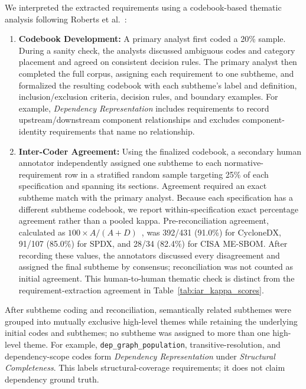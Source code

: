 We interpreted the extracted requirements using a codebook-based thematic analysis following Roberts et al.~\cite{roberts2019attempting}:

\begin{enumerate}
\item \textbf{Codebook Development:} A primary analyst first coded a 20\% sample. During a sanity check, the analysts discussed ambiguous codes and category placement and agreed on consistent decision rules. The primary analyst then completed the full corpus, assigning each requirement to one subtheme, and formalized the resulting codebook with each subtheme's label and definition, inclusion/exclusion criteria, decision rules, and boundary examples. For example, \textit{Dependency Representation} includes requirements to record upstream/downstream component relationships and excludes component-identity requirements that name no relationship.
\item \textbf{Inter-Coder Agreement:} Using the finalized codebook, a secondary human annotator independently assigned one subtheme to each normative-requirement row in a stratified random sample targeting 25\% of each specification and spanning its sections. Agreement required an exact subtheme match with the primary analyst. Because each specification has a different subtheme codebook, we report within-specification exact percentage agreement rather than a pooled kappa. Pre-reconciliation agreement, calculated as $100\times A/(A+D)$~\cite{milesandhuberman1994,roberts2019attempting}, was 392/431 (91.0\%) for CycloneDX, 91/107 (85.0\%) for SPDX, and 28/34 (82.4\%) for CISA ME-SBOM. After recording these values, the annotators discussed every disagreement and assigned the final subtheme by consensus; reconciliation was not counted as initial agreement. This human-to-human thematic check is distinct from the requirement-extraction agreement in Table~\ref{tab:iar_kappa_scores}.

\end{enumerate}

After subtheme coding and reconciliation, semantically related subthemes were grouped into mutually exclusive high-level themes while retaining the underlying initial codes and subthemes; no subtheme was assigned to more than one high-level theme. For example, \texttt{dep\_graph\_population}, transitive-resolution, and dependency-scope codes form \textit{Dependency Representation} under \textit{Structural Completeness}. This labels structural-coverage requirements; it does not claim dependency ground truth.

